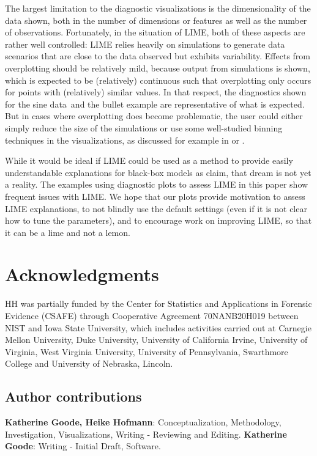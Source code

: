 \documentclass[AMS,STIX2COL]{WileyNJD-v2}\usepackage[]{graphicx}\usepackage[]{color}
\newcommand{\data}{sine data}
\begin{document}
The largest limitation to the diagnostic visualizations is the dimensionality of the data shown, both in the number of dimensions or features as well as the number of observations. Fortunately, in the situation of LIME, both of these aspects are rather well controlled: LIME relies heavily on simulations to generate data scenarios that are close to the data observed but exhibits variability. Effects from overplotting should be relatively mild, because output from simulations is shown, which is expected to be (relatively) continuous such that overplotting only occurs for points with (relatively) similar values. In that respect, the diagnostics shown for the \data \ and the bullet example are representative of what is expected. But in cases where overplotting does become problematic, the user could either simply reduce the size of the simulations or use some well-studied binning techniques in the visualizations, as discussed for example in \citet{carr:1987} or \citet{unwin:2006}. 

While it would be ideal if LIME could be used as a method to provide easily understandable explanations for black-box models as \citet{ribeiro:2016} claim, that dream is not yet a reality. The examples using diagnostic plots to assess LIME in this paper show frequent issues with LIME. We hope that our plots provide motivation to assess LIME explanations, to not blindly use the default settings (even if it is not clear how to tune the parameters), and to encourage work on improving LIME, so that it can be a lime and not a lemon.

\section*{Acknowledgments}

HH was partially funded by the Center for Statistics and Applications in Forensic Evidence (CSAFE) through Cooperative Agreement 70NANB20H019 between NIST and Iowa State University, which includes activities carried out at Carnegie Mellon University, Duke University, University of California Irvine, University of Virginia, West Virginia University, University of Pennsylvania, Swarthmore College and University of Nebraska, Lincoln.

\subsection*{Author contributions}

{\bf Katherine Goode, Heike Hofmann}: Conceptualization, Methodology, Investigation, Visualizations, Writing - Reviewing and Editing. {\bf Katherine Goode}: Writing - Initial Draft, Software.
\end{document}
